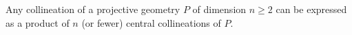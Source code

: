 Any collineation of a projective geometry $P$ of dimension $n \geq 2$ can be expressed as a product of $n$ (or fewer) central collineations of $P$.
